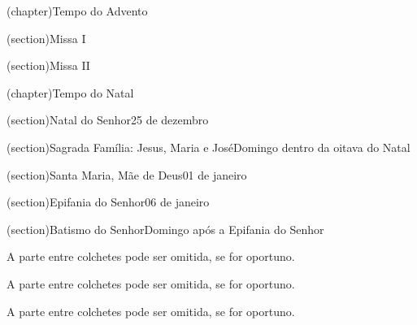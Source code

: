 
\upart(chapter){Tempo do Advento}\label{chapter:tempus-adventus}

\uchapter*(section){Missa I}\label{section:tempus-adventus/missa-1}


\uchapter(section){Missa II}\label{section:tempus-adventus/missa-2}


\upart(chapter){Tempo do Natal}\label{chapter:tempus-nativitatis}

\Solemnitas*(section){Natal do Senhor}{25 de dezembro}\label{section:tempus-nativitatis/in-nativitatis-domini}


\Festum(section){Sagrada Família: Jesus, Maria e José}{Domingo dentro da oitava do Natal}\label{section:tempus-nativitatis/sanctae-familiae}


\Solemnitas(section){Santa Maria, Mãe de Deus}{01 de janeiro}\label{section:tempus-nativitatis/sanctae-dei-genetricis-mariae}


\Solemnitas(section){Epifania do Senhor}{06 de janeiro}\label{section:tempus-nativitatis/in-epiphania-domini}


\Festum(section){Batismo do Senhor}{Domingo após a Epifania do Senhor}\label{section:tempus-nativitatis/in-baptismate-domini}


\appendix

\label{appendix}

\openleft
{}\label{appendix:te-deum-simplex}

\begin{rubrica}
  A parte entre colchetes pode ser omitida, se for oportuno.
\end{rubrica}

\AllowPageBreak

\begin{rubrica}
  A parte entre colchetes pode ser omitida, se for oportuno.
\end{rubrica}

\AllowPageBreak

\begin{rubrica}
  A parte entre colchetes pode ser omitida, se for oportuno.
\end{rubrica}

\AllowPageBreak

\label{appendix:veni-creator-spiritus}

